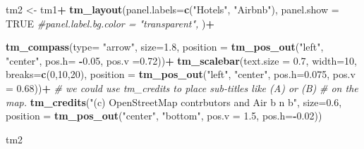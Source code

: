 \documentclass[
]{article}
\newenvironment{Shaded}{\begin{snugshade}}{\end{snugshade}}
\newcommand{\AttributeTok}[1]{\textcolor[rgb]{0.13,0.29,0.53}{#1}}
\newcommand{\CommentTok}[1]{\textcolor[rgb]{0.56,0.35,0.01}{\textit{#1}}}
\newcommand{\ConstantTok}[1]{\textcolor[rgb]{0.56,0.35,0.01}{#1}}
\newcommand{\DecValTok}[1]{\textcolor[rgb]{0.00,0.00,0.81}{#1}}
\newcommand{\FloatTok}[1]{\textcolor[rgb]{0.00,0.00,0.81}{#1}}
\newcommand{\FunctionTok}[1]{\textcolor[rgb]{0.13,0.29,0.53}{\textbf{#1}}}
\newcommand{\NormalTok}[1]{#1}
\newcommand{\OtherTok}[1]{\textcolor[rgb]{0.56,0.35,0.01}{#1}}
\newcommand{\SpecialCharTok}[1]{\textcolor[rgb]{0.81,0.36,0.00}{\textbf{#1}}}
\newcommand{\StringTok}[1]{\textcolor[rgb]{0.31,0.60,0.02}{#1}}
\begin{document}
\begin{Shaded}
\begin{Highlighting}[]
\NormalTok{tm2 }\OtherTok{\textless{}{-}}\NormalTok{ tm1}\SpecialCharTok{+}
  \FunctionTok{tm\_layout}\NormalTok{(}\AttributeTok{panel.labels=}\FunctionTok{c}\NormalTok{(}\StringTok{"Hotels"}\NormalTok{, }\StringTok{"Airbnb"}\NormalTok{),}
            \AttributeTok{panel.show =} \ConstantTok{TRUE}
            \CommentTok{\#panel.label.bg.color = "transparent",}
\NormalTok{            )}\SpecialCharTok{+}
  
  \FunctionTok{tm\_compass}\NormalTok{(}\AttributeTok{type=} \StringTok{"arrow"}\NormalTok{,}
            \AttributeTok{size=}\FloatTok{1.8}\NormalTok{, }
            \AttributeTok{position =} \FunctionTok{tm\_pos\_out}\NormalTok{(}\StringTok{"left"}\NormalTok{, }
                                  \StringTok{"center"}\NormalTok{,}
                                  \AttributeTok{pos.h=} \SpecialCharTok{{-}}\FloatTok{0.05}\NormalTok{,}
                                  \AttributeTok{pos.v =}\FloatTok{0.72}\NormalTok{))}\SpecialCharTok{+}
  \FunctionTok{tm\_scalebar}\NormalTok{(}\AttributeTok{text.size =} \FloatTok{0.7}\NormalTok{,}
              \AttributeTok{width=}\DecValTok{10}\NormalTok{,}
              \AttributeTok{breaks=}\FunctionTok{c}\NormalTok{(}\DecValTok{0}\NormalTok{,}\DecValTok{10}\NormalTok{,}\DecValTok{20}\NormalTok{),}
              \AttributeTok{position =} \FunctionTok{tm\_pos\_out}\NormalTok{(}\StringTok{"left"}\NormalTok{,}
                                    \StringTok{"center"}\NormalTok{, }
                                    \AttributeTok{pos.h=}\FloatTok{0.075}\NormalTok{,}
                                    \AttributeTok{pos.v =} \FloatTok{0.68}\NormalTok{))}\SpecialCharTok{+}
  \CommentTok{\# we could use tm\_credits to place sub{-}titles like (A) or (B)}
  \CommentTok{\# on the map.}
  \FunctionTok{tm\_credits}\NormalTok{(}\StringTok{"(c) OpenStreetMap contrbutors and Air b n b"}\NormalTok{,}
             \AttributeTok{size=}\FloatTok{0.6}\NormalTok{,}
             \AttributeTok{position =} \FunctionTok{tm\_pos\_out}\NormalTok{(}\StringTok{"center"}\NormalTok{,}
                                   \StringTok{"bottom"}\NormalTok{,}
                                   \AttributeTok{pos.v =} \FloatTok{1.5}\NormalTok{,}
                                   \AttributeTok{pos.h=}\SpecialCharTok{{-}}\FloatTok{0.02}\NormalTok{))}

\NormalTok{tm2}
\end{Highlighting}
\end{Shaded}
\end{document}
